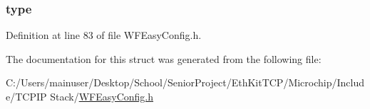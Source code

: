 \subsubsection[{type}]{ type}\label{structt_w_f_easy_config_ctx_aab7cf12125f16245546ef7411994ebb9}


Definition at line 83 of file W\+F\+Easy\+Config.\+h.



The documentation for this struct was generated from the following file\+:\begin{DoxyCompactItemize}
\item 
C\+:/\+Users/mainuser/\+Desktop/\+School/\+Senior\+Project/\+Eth\+Kit\+T\+C\+P/\+Microchip/\+Include/\+T\+C\+P\+I\+P Stack/\hyperlink{_w_f_easy_config_8h}{W\+F\+Easy\+Config.\+h}\end{DoxyCompactItemize}
